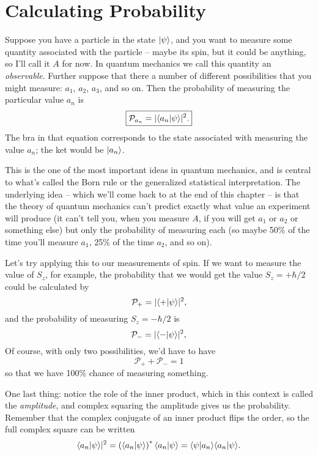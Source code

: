 \section{Calculating Probability}

Suppose you have a particle in the state $| \psi \rangle$, and you want to measure some quantity associated with the particle -- maybe its spin, but it could be anything, so I'll call it $A$ for now.  In quantum mechanics we call this quantity an \emph{observable}.  Further suppose that there a number of different possibilities that you might measure: $a_1$, $a_2$, $a_3$, and so on. Then the probability of measuring the particular value $a_n$ is
\begin{equation}
\boxed{
\mathcal{P}_{a_n} = | \langle a_n | \psi \rangle |^2.
}
\end{equation}
The bra in that equation corresponds to the state associated with measuring the value $a_n$; the ket would be $| a_n \rangle$.  

This is the one of the most important ideas in quantum mechanics, and is central to what's called the Born rule or the generalized statistical interpretation.  The underlying idea -- which we'll come back to at the end of this chapter -- is that the theory of quantum mechanics can't predict exactly what value an experiment will produce (it can't tell you, when you measure $A$, if you will get $a_1$ or $a_2$ or something else) but only the probability of measuring each (so maybe 50\% of the time you'll measure $a_1$, 25\% of the time $a_2$, and so on). 

Let's try applying this to our measurements of spin.  If we want to measure the value of $S_z$, for example, the probability that we would get the value $S_z = +\hbar/2$ could be calculated by
\[
\mathcal{P}_+ = |\langle + | \psi \rangle|^2,
\]
and the probability of measuring $S_z = -\hbar/2$ is
\[
\mathcal{P}_- = |\langle - | \psi \rangle|^2,
\]
Of course, with only two possibilities, we'd have to have
\[
\mathcal{P}_+ + \mathcal{P}_- = 1
\]
so that we have 100\% chance of measuring something.

One last thing:  notice the role of the inner product, which in this context is called the \emph{amplitude}, and complex squaring the amplitude gives us the probability.  Remember that the complex conjugate of an inner product flips the order, so the full complex square can be written 
\begin{equation}
\langle a_n | \psi \rangle |^2 = \left( \langle a_n | \psi \rangle \right)^* \langle a_n | \psi \rangle  = \langle \psi | a_n \rangle \langle a_n | \psi \rangle. 
\end{equation}

